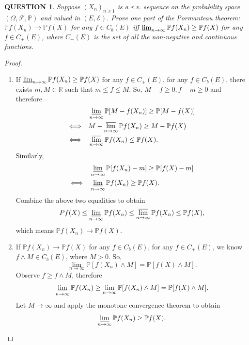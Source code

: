 \documentclass[12pt]{article}
\renewcommand{\(}{\left(}%
\renewcommand{\)}{\right)}%
\renewcommand{\[}{\left[}%
\renewcommand{\]}{\right]}%
\renewcommand{\r}{\mathbb{R}}
\newcommand{\p}{\mathbb{P}}
\newcommand{\f}{\mathscr{F}}
\newcommand{\e}{\mathscr{E}}
\newtheorem{question}{QUESTION}[section]}
\newtheorem{proof}{Proof.}}
\begin{document}
  \begin{question}
  	Suppose $(X_n)_{n\geq 1}$ is a r.v. sequence on the probability space $(\Omega,\f,\p)$ and valued in $(E,\e)$. Prove one part of the Pormanteau theorem: $\p f(X_n)\to \p f(X)$ for any $f\in C_b(E)$ iff $\varliminf_{n\to\infty}\p f(X_n)\geq \p f(X)$ for any $f\in C_+(E)$, where $C_+(E)$ is the set of all the non-negative and continuous functions.
  \end{question}
  \begin{proof}
  	\begin{enumerate}[(1)]
  		\item If $\varliminf_{n\to\infty}\p f(X_n)\geq \p f(X)$ for any $f\in C_+(E)$, for any $f\in C_b(E)$, there exists $m,M\in\r$ such that $m\leq f\leq M$. So, $M-f\geq 0,f-m\geq 0$ and therefore
  		\begin{equation*}
  			\begin{split}
  				&\varliminf_{n\to\infty}\p [M-f(X_n)]\geq \p [M-f(X)]\\
  				\Longleftrightarrow\quad & M-\varlimsup_{n\to\infty} \p f(X_n)\geq M-\p f(X)\\
  				\Longleftrightarrow\quad & \varlimsup_{n\to\infty} \p f(X_n)\leq \p f(X).
  			\end{split} 
  		\end{equation*}
  		Similarly, 
  		\begin{equation*}
  			\begin{split}
  				&\varliminf_{n\to\infty}\p [f(X_n)-m]\geq \p [f(X)-m]\\
  				\Longleftrightarrow\quad & \varliminf_{n\to\infty} \p f(X_n)\geq \p f(X).
  			\end{split}
  		\end{equation*}
  		Combine the above two equalities to obtain
  		\begin{equation*}
  			Pf(X)\leq \varliminf_{n\to\infty} \p f(X_n)\leq \varlimsup_{n\to\infty} \p f(X_n)\leq \p f(X),
  		\end{equation*}
  		which means $\p f(X_n)\to \p f(X)$.
  		\item If $\p f(X_n)\to \p f(X)$ for any $f\in C_b(E)$, for any  $f\in C_+(E)$, we know $f\wedge M\in C_b(E)$, where $M>0$. So,
  		\begin{equation*}
  			\lim_{n\to\infty}\p [f(X_n)\wedge M]=\p[f(X)\wedge M].
  		\end{equation*}
  		Observe $f\geq f\wedge M$, therefore
  		\begin{equation*}
  			\varliminf_{n\to\infty}\p f(X_n)\geq \lim_{n\to\infty}\p [f(X_n)\wedge M]=\p[f(X)\wedge M].
  		\end{equation*}
  		Let $M\to\infty$ and apply the monotone convergence theorem to obtain
  		\begin{equation*}
  			\varliminf_{n\to\infty}\p f(X_n)\geq \p f(X).
  		\end{equation*}
  	\end{enumerate}
  \end{proof}
  
\end{document}
